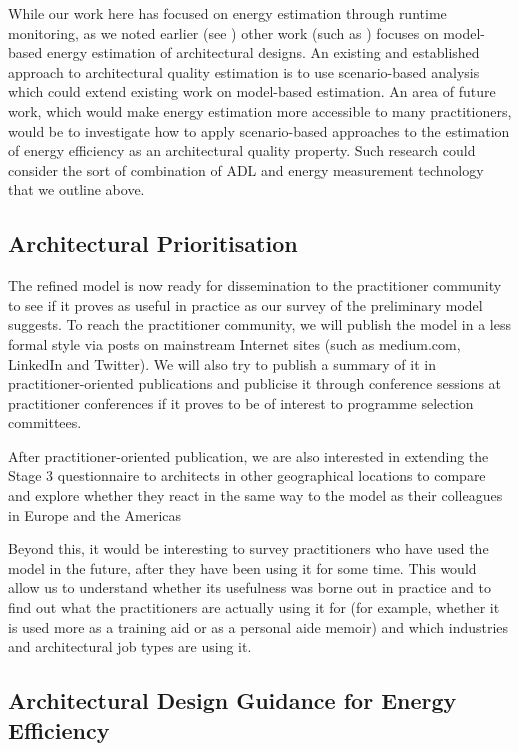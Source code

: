 While our work here has focused on energy estimation through runtime monitoring, as we noted earlier (see ) other work (such as 
\cite{grahn1998-energystyles}) focuses on model-based energy estimation of architectural designs.  An existing and established approach to architectural quality estimation is to use scenario-based analysis \cite{babar2004comparison} which could extend existing work on model-based estimation.  An area of future work, which would make energy estimation more accessible to many practitioners, would be to investigate how to apply scenario-based approaches to the estimation of energy efficiency as an architectural quality property.  Such research could consider the sort of combination of ADL and energy measurement technology that we outline above.

\subsection{Architectural Prioritisation}

The refined model is now ready for dissemination to the practitioner community to see if it proves as useful in practice as our survey of the preliminary model suggests.  To reach the practitioner community, we will publish the model in a less formal style via posts on mainstream Internet sites (such as medium.com, LinkedIn and Twitter).  We will also try to publish a summary of it in practitioner-oriented publications and publicise it through conference sessions at practitioner conferences if it proves to be of interest to programme selection committees.

After practitioner-oriented publication, we are also interested in extending the Stage 3 questionnaire to architects in other geographical locations to compare and explore whether they react in the same way to the model as their colleagues in Europe and the Americas

Beyond this, it would be interesting to survey practitioners who have used the model in the future, after they have been using it for some time.  This would allow us to understand whether its usefulness was borne out in practice and to find out what the practitioners are actually using it for (for example, whether it is used more as a training aid or as a personal aide memoir) and which industries and architectural job types are using it.

\subsection{Architectural Design Guidance for Energy Efficiency}

